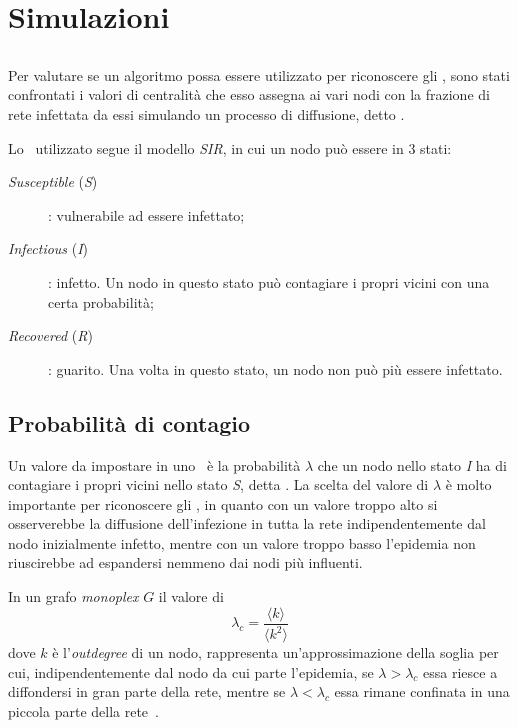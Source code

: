 \chapter{Simulazioni}

\section{\Spproc}
Per valutare se un algoritmo possa essere utilizzato per riconoscere gli \infsp, 
sono stati confrontati i valori di centralità che esso assegna ai vari nodi con la frazione di 
rete infettata da essi simulando un processo di diffusione, detto \spproc.

Lo \spproc\ utilizzato segue il modello \textit{SIR}, in cui un nodo può essere in 3 stati:
\begin{description}
    \item[\textit{Susceptible} (\textit{S})] : vulnerabile ad essere infettato;
    \item[\textit{Infectious} (\textit{I})] : infetto. Un nodo in questo stato può contagiare
        i propri vicini con una certa probabilità;
    \item[\textit{Recovered} (\textit{R})] : guarito. Una volta in questo stato, un nodo non può più essere
        infettato.
\end{description}

\section{Probabilità di contagio}
\label{sec:epprob}
Un valore da impostare in uno \spproc\ è la probabilità $\lambda$ che un nodo nello stato \textit{I}
ha di contagiare i propri vicini nello stato \textit{S}, detta \epprob.
La scelta del valore di $\lambda$ è molto importante per riconoscere gli \infsp, 
in quanto con un valore troppo alto si osserverebbe la diffusione dell'infezione in tutta la 
rete indipendentemente dal nodo inizialmente infetto, mentre con un valore troppo basso l'epidemia 
non riuscirebbe ad espandersi nemmeno dai nodi più influenti. 

In un grafo \textit{monoplex} $G$ il valore di \crepp\
\begin{equation}
    \lambda_c = \frac{\langle k  \rangle}{\langle k^2 \rangle}
\end{equation}
dove $k$ è l'\textit{outdegree} di un nodo, rappresenta un'approssimazione della soglia per 
cui, indipendentemente dal nodo da cui parte l'epidemia, se $\lambda > \lambda_c$ essa riesce 
a diffondersi in gran parte della rete, mentre se $\lambda < \lambda_c$ essa rimane confinata 
in una piccola parte della rete~\cite{saumell:epidemicsp}.

